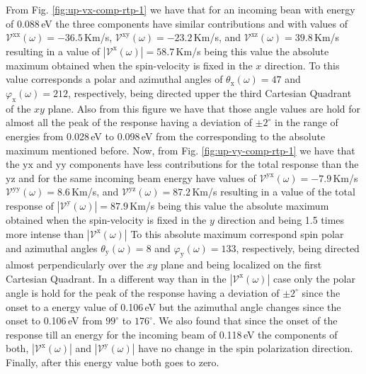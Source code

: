 \documentclass[prb,11pt,tightenlines,twocolumn,aps]{revtex4-1}
\begin{document}
From Fig. \ref{fig:up-vx-comp-rtp-1} we have that for an incoming bean with
energy of 0.088\,eV the three components have similar contributions and with
values of 
% 
$\mathcal{V}^{\mathrm{xx}}(\omega)=-36.5$\,Km/s,
$\mathcal{V}^{\mathrm{xy}}(\omega)=-23.2$\,Km/s, and
$\mathcal{V}^{\mathrm{xz}}(\omega)= 39.8$\,Km/s 
% 
resulting in a value of
% 
$|\mathcal{V}^{\mathrm{x}}(\omega)|=58.7$\,Km/s 
% 
being this value the absolute maximum obtained when the spin-velocity is fixed
in the $x$ direction. To this value corresponds a polar and azimuthal angles of
$\theta_{\mathrm{x}}(\omega)=47$ and $\varphi_{\mathrm{x}}(\omega)=212$,
respectively, being directed upper the third Cartesian Quadrant of the $xy$
plane. Also from this figure we have that those angle values are hold for almost
all the peak of the response having a deviation of $\pm 2^{\circ}$ in the range
of energies from 0.028\,eV to 0.098\,eV from the corresponding to the absolute
maximum mentioned before.
% 
Now, from Fig. \ref{fig:up-vy-comp-rtp-1} we have that the $\mathrm{yx}$ and
$\mathrm{yy}$ components have less contributions for the total response than the
$\mathrm{yz}$ and for the same incoming beam energy have values of
% 
$\mathcal{V}^{\mathrm{yx}}(\omega)= -7.9$\,Km/s 
$\mathcal{V}^{\mathrm{yy}}(\omega)=  8.6$\,Km/s, and
$\mathcal{V}^{\mathrm{yz}}(\omega)= 87.2$\,Km/s 
% 
resulting in a value of the total response of
% 
$|\mathcal{V}^{\mathrm{y}}(\omega)|=87.9$\,Km/s
% 
being this value the absolute maximum obtained when the spin-velocity is fixed
in the $y$ direction and being 1.5 times more intense than
$|\mathcal{V}^{\mathrm{x}}(\omega)|$ To this absolute maximum correspond spin
polar and azimuthal angles $\theta_{\mathrm{y}}(\omega)=8$ and
$\varphi_{\mathrm{y}}(\omega)=133$, respectively, being directed almost
perpendicularly over the $xy$ plane and being localized on the first Cartesian
Quadrant. In a different way than in the $|\mathcal{V}^{\mathrm{x}}(\omega)|$
case only the polar angle is hold for the peak of the response having a
deviation of $\pm 2^{\circ}$ since the onset to a energy value of 0.106\,eV but
the azimuthal angle changes since the onset to 0.106\,eV from $99^{\circ}$ to
$176^{\circ}$.
% 
We also found that since the onset of the response till an
energy for the incoming beam of 0.118\,eV the components of both,
$|\mathcal{V}^{\mathrm{x}}(\omega)|$ and $|\mathcal{V}^{\mathrm{y}}(\omega)|$
have no change in the spin polarization direction. Finally, after this energy
value both goes to zero.
\end{document}
